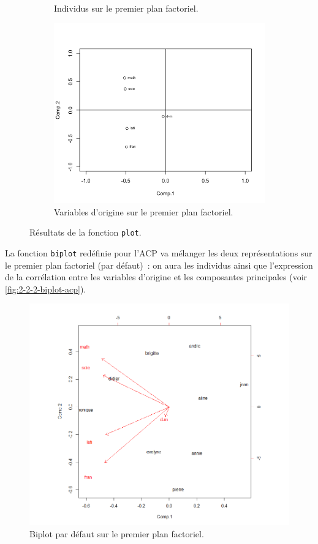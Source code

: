 \documentclass[a4paper,10pt]{report}
\begin{document}
\begin{figure}[H]
\begin{subfigure}[b]{0.28\linewidth}
		\caption{\scriptsize Individus sur le premier plan factoriel.}
		\label{fig:2-2-2-plot-acp-scores}
	\end{subfigure}%
	\begin{subfigure}[b]{0.28\linewidth}
		\centering
		\captionsetup{justification=centering}
		\includegraphics[width=1\linewidth]{img/2-2-2-plot-acp-loadings}
		\caption{\scriptsize Variables d'origine sur le premier plan factoriel.}
		\label{fig:2-2-2-plot-acp-loadings}
	\end{subfigure}%
	\caption{Résultats de la fonction \texttt{plot}.}
\end{figure}



La fonction \texttt{biplot} redéfinie pour l'ACP va mélanger les deux représentations sur le premier plan factoriel (par défaut)~: on aura les individus ainsi que l'expression de la corrélation entre les variables d'origine et les composantes principales (voir \autoref{fig:2-2-2-biplot-acp}).

\begin{figure}[H]
	\centering
	\captionsetup{justification=centering, margin=1cm}
	\includegraphics[width=.5\linewidth]{img/2-2-2-biplot-composante-1-2}
	\caption{\scriptsize Biplot par défaut sur le premier plan factoriel.}
	\label{fig:2-2-2-biplot-acp}
\end{figure}
\end{document}
